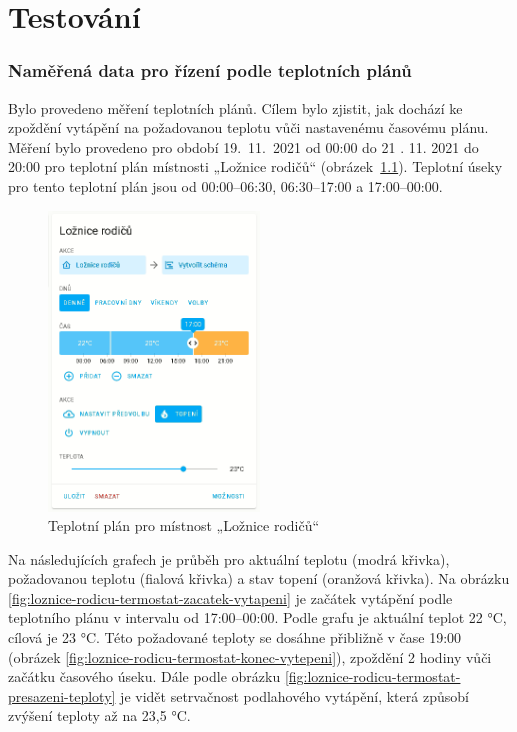 \chapter{Testování}

\subsection{Naměřená data pro řízení podle teplotních plánů}

Bylo provedeno měření teplotních plánů. Cílem bylo zjistit, jak dochází ke zpoždění vytápění na požadovanou teplotu vůči nastavenému časovému plánu. Měření bylo provedeno pro období 19.~11.~2021 od 00:00 do 21 . 11. 2021 do 20:00 pro teplotní plán místnosti „Ložnice rodičů“ (obrázek~\ref{fig:teplotni-plan-loznice-rodicu}). Teplotní úseky pro tento teplotní plán jsou od 00:00–06:30, 06:30–17:00 a 17:00–00:00.

\begin{figure}[H]
    \centering
    \includegraphics[width=0.5\textwidth]{images/testovani/teplotni-plany/teplotni-plan-loznice-rodicu.png}
    \caption{Teplotní plán pro místnost „Ložnice rodičů“}
    \label{fig:teplotni-plan-loznice-rodicu}
\end{figure}

Na následujících grafech je průběh pro aktuální teplotu (modrá křivka), požadovanou teplotu (fialová křivka) a stav topení (oranžová křivka). Na obrázku \ref{fig:loznice-rodicu-termostat-zacatek-vytapeni} je začátek vytápění podle teplotního plánu v intervalu od 17:00–00:00. Podle grafu je aktuální teplot 22 °C, cílová je 23 °C. Této požadované teploty se dosáhne přibližně v čase 19:00 (obrázek \ref{fig:loznice-rodicu-termostat-konec-vytepeni}), zpoždění 2 hodiny vůči začátku časového úseku. Dále podle obrázku \ref{fig:loznice-rodicu-termostat-presazeni-teploty} je vidět setrvačnost podlahového vytápění, která způsobí zvýšení teploty až na 23,5 °C.




